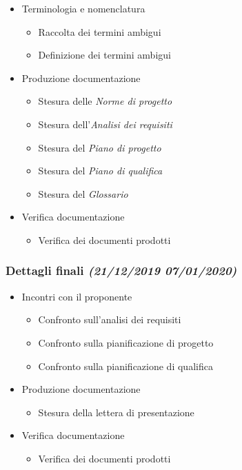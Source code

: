 \documentclass[../piano-di-progetto.tex]{subfiles}
\begin{document}
\begin{itemize}
\begin{itemize}
  \end{itemize}
  \item Terminologia e nomenclatura
  \begin{itemize}
    \item Raccolta dei termini ambigui
    \item Definizione dei termini ambigui
  \end{itemize}
  \item Produzione documentazione
  \begin{itemize}
    \item Stesura delle \textit{Norme di progetto}
    \item Stesura dell'\textit{Analisi dei requisiti}
    \item Stesura del \textit{Piano di progetto}
    \item Stesura del \textit{Piano di qualifica}
    \item Stesura del \textit{Glossario}
  \end{itemize}
  \item Verifica documentazione
  \begin{itemize}
    \item Verifica dei documenti prodotti
  \end{itemize}
\end{itemize}
\subsubsection[Dettagli finali]{Dettagli finali {\normalsize\normalfont\itshape(21/12/2019  07/01/2020)}}%
\label{subs:dettagli_finali}
\begin{itemize}
  \item Incontri con il proponente
  \begin{itemize}
    \item Confronto sull'analisi dei requisiti
    \item Confronto sulla pianificazione di progetto
    \item Confronto sulla pianificazione di qualifica
  \end{itemize}
  \item Produzione documentazione
  \begin{itemize}
    \item Stesura della lettera di presentazione
  \end{itemize}
  \item Verifica documentazione
  \begin{itemize}
    \item Verifica dei documenti prodotti
  \end{itemize}
\end{itemize}
\end{document}
